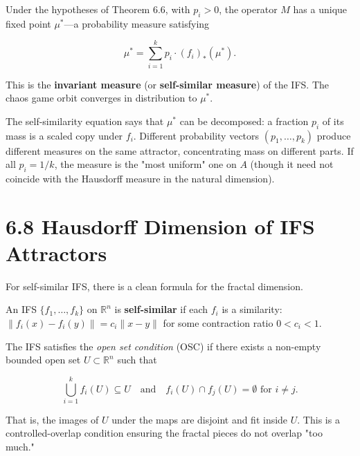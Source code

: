 \begin{theorem}
Under the hypotheses of Theorem 6.6, with $p_i > 0$, the operator $M$ has a unique fixed point $\mu^*$—a probability measure satisfying

\[
\mu^* = \sum_{i=1}^{k} p_i \cdot (f_i)_{*}(\mu^*).
\]

This is the \textbf{invariant measure} (or \textbf{self-similar measure}) of the IFS. The chaos game orbit converges in distribution to $\mu^*$.

The self-similarity equation says that $\mu^*$ can be decomposed: a fraction $p_i$ of its mass is a scaled copy under $f_i$. Different probability vectors $(p_1, \ldots, p_k)$ produce different measures on the same attractor, concentrating mass on different parts. If all $p_i = 1/k$, the measure is the "most uniform" one on $A$ (though it need not coincide with the Hausdorff measure in the natural dimension).
\end{theorem}

\section{6.8 Hausdorff Dimension of IFS Attractors}

For self-similar IFS, there is a clean formula for the fractal dimension.

\begin{definition}
An IFS $\{ f_1, \ldots, f_k\} $ on $\mathbb{R}^n$ is \textbf{self-similar} if each $f_i$ is a similarity: $\|f_i(x) - f_i(y)\| = c_i \|x - y\|$ for some contraction ratio $0 < c_i < 1$.
\end{definition}

\begin{definition}
The IFS satisfies the \textit{open set condition} (OSC) if there exists a non-empty bounded open set $U \subset \mathbb{R}^n$ such that

\[
\bigcup_{i=1}^k f_i(U) \subseteq U \quad \text{and} \quad f_i(U) \cap f_j(U) = \emptyset \text{ for } i \ne j.
\]

That is, the images of $U$ under the maps are disjoint and fit inside $U$. This is a controlled-overlap condition ensuring the fractal pieces do not overlap "too much."
\end{definition}

